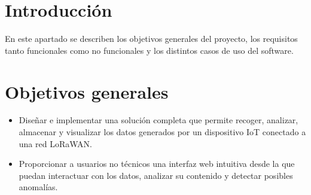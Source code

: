 
\section{Introducción}

En este apartado se describen los objetivos generales del proyecto, los requisitos tanto funcionales como no funcionales y los distintos casos de uso del software.

%
\section{Objetivos generales}


\begin{itemize}
    \item Diseñar e implementar una solución completa que permite recoger, analizar, almacenar y visualizar los datos generados por un dispositivo IoT conectado a una red LoRaWAN.
    \item Proporcionar a usuarios no técnicos una interfaz web intuitiva desde la que puedan interactuar con los datos, analizar su contenido y detectar posibles anomalías.
\end{itemize}
    


